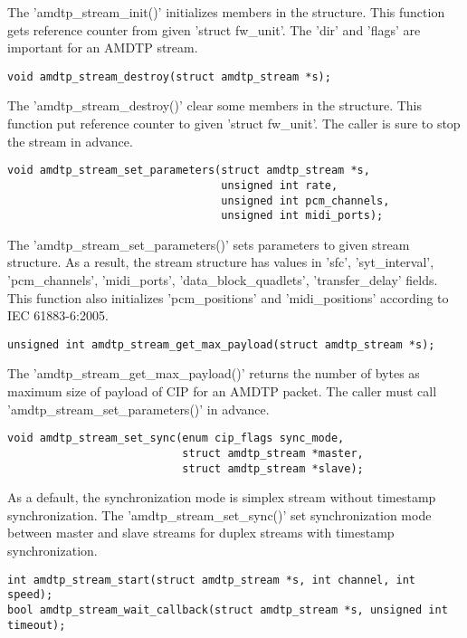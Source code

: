 \documentclass[onecolumn]{article}
\begin{document}
The 'amdtp\_stream\_init()' initializes members in the structure. This function gets reference counter from given 'struct fw\_unit'. The 'dir' and 'flags' are important for an AMDTP stream.

\begin{verbatim}
void amdtp_stream_destroy(struct amdtp_stream *s);
\end{verbatim}

The 'amdtp\_stream\_destroy()' clear some members in the structure. This function put reference counter to given 'struct fw\_unit'. The caller is sure to stop the stream in advance.

\begin{verbatim}
void amdtp_stream_set_parameters(struct amdtp_stream *s,
                                 unsigned int rate,
                                 unsigned int pcm_channels,
                                 unsigned int midi_ports);
\end{verbatim}

The 'amdtp\_stream\_set\_parameters()' sets parameters to given stream structure. As a result, the stream structure has values in 'sfc', 'syt\_interval', 'pcm\_channels', 'midi\_ports', 'data\_block\_quadlets', 'transfer\_delay' fields. This function also initializes 'pcm\_positions' and 'midi\_positions' according to IEC 61883-6:2005.

\begin{verbatim}
unsigned int amdtp_stream_get_max_payload(struct amdtp_stream *s);
\end{verbatim}

The 'amdtp\_stream\_get\_max\_payload()' returns the number of bytes as maximum size of payload of CIP for an AMDTP packet. The caller must call 'amdtp\_stream\_set\_parameters()' in advance.

\begin{verbatim}
void amdtp_stream_set_sync(enum cip_flags sync_mode,
                           struct amdtp_stream *master,
                           struct amdtp_stream *slave);
\end{verbatim}

As a default, the synchronization mode is simplex stream without timestamp synchronization. The 'amdtp\_stream\_set\_sync()' set synchronization mode between master and slave streams for duplex streams with timestamp synchronization.

\begin{verbatim}
int amdtp_stream_start(struct amdtp_stream *s, int channel, int speed);
bool amdtp_stream_wait_callback(struct amdtp_stream *s, unsigned int timeout);
\end{verbatim}
\end{document}
